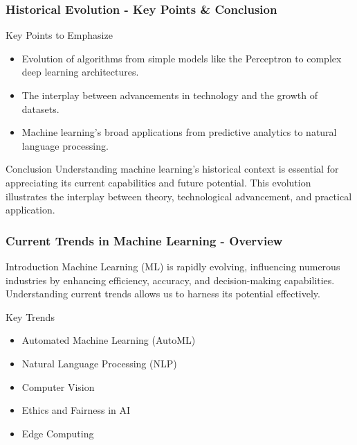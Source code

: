 \documentclass[aspectratio=169]{beamer}
\begin{document}
\begin{frame}[fragile]
    \frametitle{Historical Evolution - Key Points & Conclusion}
    \begin{block}{Key Points to Emphasize}
        \begin{itemize}
            \item Evolution of algorithms from simple models like the Perceptron to complex deep learning architectures.
            \item The interplay between advancements in technology and the growth of datasets.
            \item Machine learning's broad applications from predictive analytics to natural language processing.
        \end{itemize}
    \end{block}
    \begin{block}{Conclusion}
        Understanding machine learning's historical context is essential for appreciating its current capabilities and future potential. 
        This evolution illustrates the interplay between theory, technological advancement, and practical application.
    \end{block}
\end{frame}

\begin{frame}[fragile]
    \frametitle{Current Trends in Machine Learning - Overview}
    \begin{block}{Introduction}
        Machine Learning (ML) is rapidly evolving, influencing numerous industries by enhancing efficiency, accuracy, and decision-making capabilities. Understanding current trends allows us to harness its potential effectively.
    \end{block}
    
    \begin{block}{Key Trends}
        \begin{itemize}
            \item Automated Machine Learning (AutoML)
            \item Natural Language Processing (NLP)
            \item Computer Vision
            \item Ethics and Fairness in AI
            \item Edge Computing
        \end{itemize}
    \end{block}
\end{frame}
\end{document}
